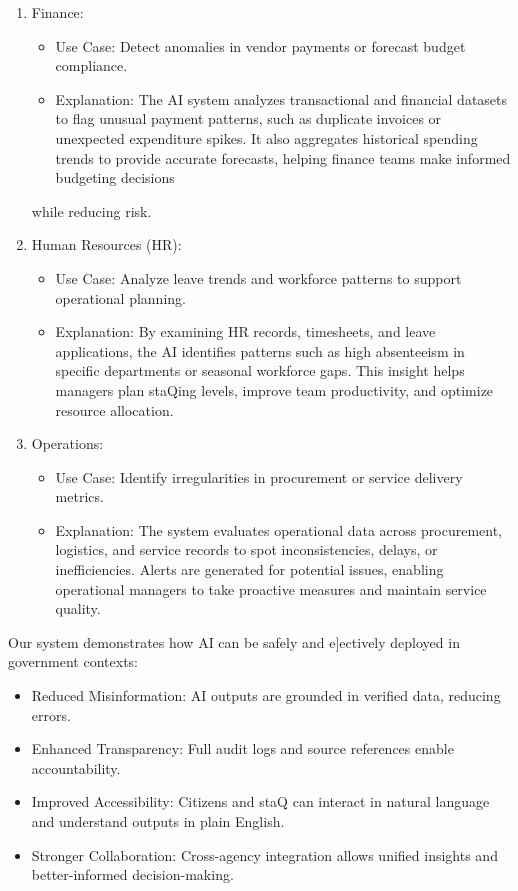 \begin{enumerate}
    \item Finance:
    \begin{itemize}
        \item Use Case: Detect anomalies in vendor payments or forecast budget
        compliance.
        \item Explanation: The AI system analyzes transactional and financial datasets to flag
        unusual payment patterns, such as duplicate invoices or unexpected
        expenditure spikes. It also aggregates historical spending trends to provide
        accurate forecasts, helping finance teams make informed budgeting decisions
    \end{itemize}
    while reducing risk.
    \item Human Resources (HR):
    \begin{itemize}
        \item Use Case: Analyze leave trends and workforce patterns to support operational
        planning.
        \item Explanation: By examining HR records, timesheets, and leave applications, the
        AI identifies patterns such as high absenteeism in specific departments or
        seasonal workforce gaps. This insight helps managers plan staQing levels,
        improve team productivity, and optimize resource allocation.
    \end{itemize}
    \item Operations:
    \begin{itemize}
        \item Use Case: Identify irregularities in procurement or service delivery metrics.
        \item Explanation: The system evaluates operational data across procurement,
        logistics, and service records to spot inconsistencies, delays, or inefficiencies.
        Alerts are generated for potential issues, enabling operational managers to take
        proactive measures and maintain service quality.
    \end{itemize}
\end{enumerate}



Our system demonstrates how AI can be safely and e]ectively deployed in
government contexts:

\begin{itemize}
    \item Reduced Misinformation: AI outputs are grounded in verified data, reducing
    errors.
    \item Enhanced Transparency: Full audit logs and source references enable
    accountability.
    \item Improved Accessibility: Citizens and staQ can interact in natural language and
    understand outputs in plain English.
    \item Stronger Collaboration: Cross-agency integration allows unified insights and
    better-informed decision-making.
\end{itemize}

